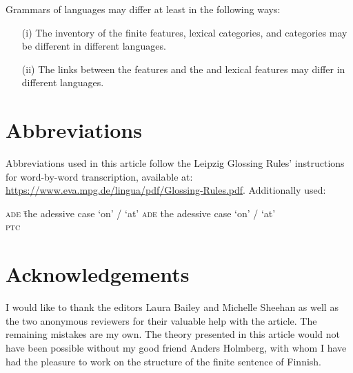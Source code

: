 \documentclass[output=paper]{langsci/langscibook}
\begin{document}
Grammars of languages may differ at least in the following ways:

\begin{enumerate}
\item[(i)] The inventory of the finite features, lexical categories, and  categories may be different in different languages.
\item[(ii)] The links between the features and the  and lexical features  may differ in different languages.
\end{enumerate}

 
\section*{Abbreviations}
\largerpage Abbreviations used in this article follow the Leipzig Glossing Rules’ instructions for word-by-word transcription, available at: \url{https://www.eva.mpg.de/lingua/pdf/Glossing-Rules.pdf}. Additionally used:\largerpage
\begin{multicols}{2}
\begin{tabbing}
\textsc{ade} \= the adessive case ‘on’ / ‘at’\kill
 \textsc{ade} \> the adessive case ‘on’ / ‘at’\\
 \textsc{ptc} \> 
\end{tabbing}
\end{multicols}

\section*{Acknowledgements}
I would like to thank the editors Laura Bailey and Michelle Sheehan as well as the two anonymous reviewers for their valuable help with the article. The remaining mistakes are my own. The theory presented in this article would not have been possible without my good friend Anders Holmberg, with whom I have had the pleasure to work on the structure of the finite sentence of {Finnish}.

\printbibliography[heading=subbibliography,notkeyword=this]
\end{document}
